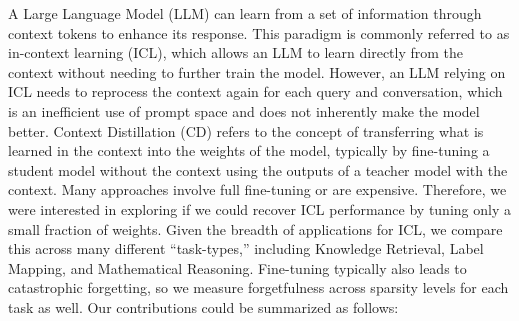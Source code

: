 \documentclass{article} %
\newcommand{\todo}[1]{{\color{red}[TODO: #1]}}
\begin{document}
A Large Language Model (LLM) can learn from a set of information through context tokens to enhance its response. This paradigm is commonly referred to as in-context learning (ICL), which allows an LLM to learn directly from the context without needing to further train the model. However, an LLM relying on ICL needs to reprocess the context again for each query and conversation, which is an inefficient use of prompt space and does not inherently make the model better. Context Distillation (CD) refers to the concept of transferring what is learned in the context into the weights of the model, typically by fine-tuning a student model without the context using the outputs of a teacher model with the context. Many approaches involve full fine-tuning or are expensive. Therefore, we were interested in exploring if we could recover ICL performance by tuning only a small fraction of weights. Given the breadth of applications for ICL, we compare this across many different ``task-types,'' including Knowledge Retrieval, Label Mapping, and Mathematical Reasoning. Fine-tuning typically also leads to catastrophic forgetting, so we measure forgetfulness across sparsity levels for each task as well. Our contributions could be summarized as follows:



\end{document}

